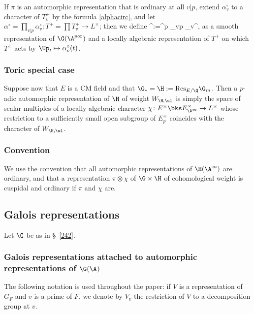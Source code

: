 If $\pi$ is an automorphic representation that is ordinary at  all $v\vert  p$, extend $\alpha_{v}^{\circ}$ to a character of $T_{v}^{+}$ by the formula \eqref{alphacirc}, and let $\alpha^{\circ}=\prod_{v\vert p}\alpha_{v}^{\circ}\colon T^{+}=\prod T_{v}^{+}\to L^{\times}$; then we define
\beq\label{piord}
\pi^{\ord}:=\pi^{p\infty} \otimes\otimes_{v\vert p} \pi_{v}^{\ord},
\eeq
as a smooth representation of $\G(\A^{p\infty})$ and  a locally algebraic representation of $T^{+}$ on which $ T^{+}$ acts by $\Up_{t}\mapsto \alpha_{v}^{\circ}(t)$.











\subsubsection{Toric special case}  
Suppose now that $E$ is a CM field and that $\G_{*}=\H:={\rm Res}_{E/\Q}\G_{m}$.
Then a $p$-adic automorphic representation of $\H$ of weight $W_{\H, \ul}$ is
simply the space of scalar multiples of a locally algebraic character $\chi\colon E^{\times}\bks E_{\A^{\infty}}^{\times}\to L^{\times}$ whose restriction to a sufficiently small open subgroup of $E_{p}^{\times}$ coincides with  the character of $W_{\H, \ul}$.



\subsubsection{Convention} We use the convention  that all automorphic representations of $\H(\A^{\infty})$ are ordinary, and that a  representation $\pi\otimes \chi$ of $\G\times \H$ of cohomological weight is cuspidal and  ordinary  if $\pi$ and $\chi$ are.




\subsection{Galois representations} Let $\G$ be as in \S~\ref{242}.
\subsubsection{Galois representations attached to automorphic representations of $\G(\A^{})$}
The following notation is used throughout the paper: if $V$ is a representation of $G_{F}$ and $v$ is a prime of $F$, we denote by $V_{v}$ the restriction of $V$ to a decomposition group at $v$.

